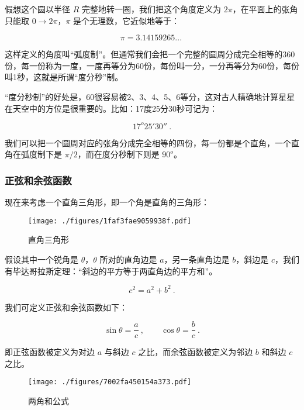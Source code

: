 假想这个圆以半径 $R$ 完整地转一圈，我们把这个角度定义为 $2 \pi$，在平面上的张角只能取 $0 \to 2 \pi$，$\pi$ 是个无理数，它近似地等于：

\begin{equation}
\pi = 3.14159265 ...~
\end{equation}

这样定义的角度叫“弧度制”。但通常我们会把一个完整的圆周分成完全相等的360份，每一份称为一度，一度再等分为60份，每份叫一分，一分再等分为60份，每份叫1秒，这就是所谓“度分秒”制。

“度分秒制”的好处是，60很容易被2、3、4、5、6等分，这对古人精确地计算星星在天空中的方位是很重要的。比如：17度25分30秒可记为：

\begin{equation}
17^o 25' 30''~.
\end{equation}

我们可以把一个圆周对应的张角分成完全相等的四份，每一份都是个直角，一个直角在弧度制下是 $\pi/2$，而在度分秒制下则是 $90^o$。

\subsubsection{正弦和余弦函数}

现在来考虑一个直角三角形，即一个角是直角的三角形：

\begin{figure}[ht]
\centering
\texttt{[image: ./figures/1faf3fae9059938f.pdf]}
\caption{直角三角形} \label{fig_AtomId_4}
\end{figure}

假设其中一个锐角是 $\theta$，$\theta$ 所对的直角边是 $a$，另一条直角边是 $b$，斜边是 $c$，我们有毕达哥拉斯定理：“斜边的平方等于两直角边的平方和”。

\begin{equation}
c^2 = a^2 + b^2~.
\end{equation}

我们可定义正弦和余弦函数如下：

\begin{equation}
\sin \theta = \frac{a}{c}~, \qquad
\cos \theta = \frac{b}{c}~.
\end{equation}

即正弦函数被定义为对边 $a$ 与斜边 $c$ 之比，而余弦函数被定义为邻边 $b$ 和斜边 $c$ 之比。

\begin{figure}[ht]
\centering
\texttt{[image: ./figures/7002fa450154a373.pdf]}
\caption{两角和公式} \label{fig_AtomId_5}
\end{figure}


